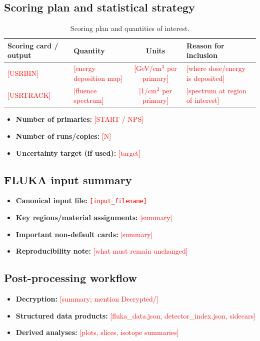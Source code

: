\documentclass[11pt]{article}
\newcommand{\placeholder}[1]{\textcolor{red}{[#1]}}
\newcommand{\code}[1]{\texttt{#1}}
\begin{document}
\subsection{Scoring plan and statistical strategy}
\begin{table}[H]
\centering
\caption{Scoring plan and quantities of interest.}
\label{tab:scoring_plan}
\begin{tabularx}{\textwidth}{l Y c Y}
\toprule
\textbf{Scoring card / output} & \textbf{Quantity} & \textbf{Units} & \textbf{Reason for inclusion} \\
\midrule
\placeholder{USRBIN} & \placeholder{energy deposition map} & \placeholder{GeV/cm$^3$ per primary} & \placeholder{where dose/energy is deposited} \\
\placeholder{USRTRACK} & \placeholder{fluence spectrum} & \placeholder{1/cm$^2$ per primary} & \placeholder{spectrum at region of interest} \\
\bottomrule
\end{tabularx}
\end{table}

\begin{itemize}[leftmargin=1.5em]
  \item \textbf{Number of primaries:} \placeholder{START / NPS}
  \item \textbf{Number of runs/copies:} \placeholder{N}
  \item \textbf{Uncertainty target (if used):} \placeholder{target}
\end{itemize}

\subsection{FLUKA input summary}
\begin{itemize}[leftmargin=1.5em]
  \item \textbf{Canonical input file:} \code{\placeholder{input\_filename}}
  \item \textbf{Key regions/material assignments:} \placeholder{summary}
  \item \textbf{Important non-default cards:} \placeholder{summary}
  \item \textbf{Reproducibility note:} \placeholder{what must remain unchanged}
\end{itemize}

\subsection{Post-processing workflow}
\begin{itemize}[leftmargin=1.5em]
  \item \textbf{Decryption:} \placeholder{summary; mention Decrypted/}
  \item \textbf{Structured data products:} \placeholder{fluka\_data.json, detector\_index.json, sidecars}
  \item \textbf{Derived analyses:} \placeholder{plots, slices, isotope summaries}
\end{itemize}
\end{document}

